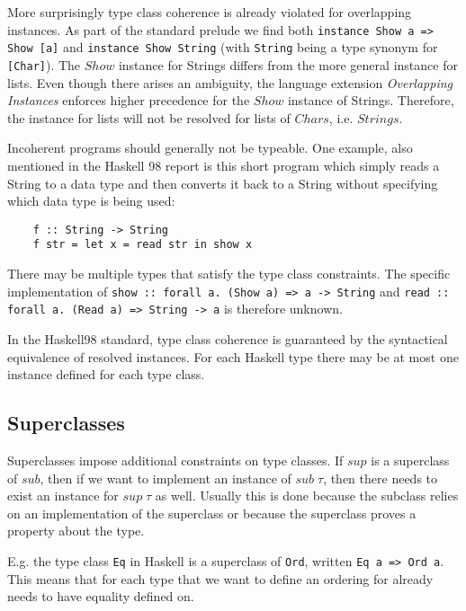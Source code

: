 More surprisingly type class coherence is already violated for overlapping instances.
As part of the standard prelude we find both \texttt{instance Show a => Show [a]} and \texttt{instance Show String}
(with \texttt{String} being a type synonym for \texttt{[Char]}).
The $\mathit{Show}$ instance for Strings differs from the more general instance for lists.
Even though there arises an ambiguity, the language extension \emph{Overlapping Instances} enforces higher precedence for the $Show$ instance of Strings.
Therefore, the instance for lists will not be resolved for lists of $Chars$, i.e. $Strings$. 

Incoherent programs should generally not be typeable.
One example, also mentioned in the Haskell 98 report \cite{Haskell98} is this short program which simply reads a String to a data type and then converts it back to a String without specifying which data type is being used:

\begin{verbatim}
    f :: String -> String
    f str = let x = read str in show x
\end{verbatim}

There may be multiple types that satisfy the type class constraints.
The specific implementation of \texttt{show :: forall a. (Show a) => a -> String} and \texttt{read :: forall a. (Read a) => String -> a} is therefore unknown.

In the Haskell98 standard, type class coherence is guaranteed by the syntactical equivalence of resolved instances.
For each Haskell type there may be at most one instance defined for each type class.


\subsection{Superclasses}

Superclasses impose additional constraints on type classes.
If $sup$ is a superclass of $sub$, then if we want to implement an instance of $sub \;\tau$, then there needs to exist an instance for $sup \;\tau$ as well.
Usually this is done because the subclass relies on an implementation of the superclass or because the superclass proves a property about the type.

E.g. the type class \texttt{Eq} in Haskell is a superclass of \texttt{Ord}, written \texttt{Eq a => Ord a}.
This means that for each type that we want to define an ordering for already needs to have equality defined on.

